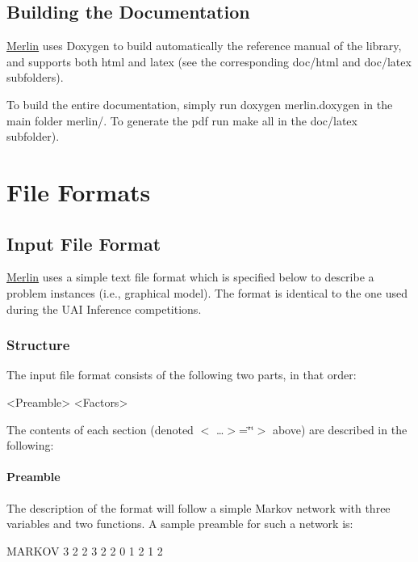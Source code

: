 \subsection*{Building the Documentation}

\hyperlink{classMerlin}{Merlin} uses Doxygen to build automatically the reference manual of the library, and supports both {\ttfamily html} and {\ttfamily latex} (see the corresponding {\ttfamily doc/html} and {\ttfamily doc/latex} subfolders).

To build the entire documentation, simply run {\ttfamily doxygen merlin.\+doxygen} in the main folder {\ttfamily merlin/}. To generate the pdf run {\ttfamily make all} in the {\ttfamily doc/latex} subfolder).

\section*{File Formats}

\subsection*{Input File Format}

\hyperlink{classMerlin}{Merlin} uses a simple text file format which is specified below to describe a problem instances (i.\+e., graphical model). The format is identical to the one used during the U\+AI Inference competitions.

\subsubsection*{Structure}

The input file format consists of the following two parts, in that order\+: \begin{DoxyVerb}    <Preamble>
    <Factors>
\end{DoxyVerb}


The contents of each section (denoted $<$ …$>$=\char`\"{}\char`\"{}$>$ above) are described in the following\+:

\paragraph*{Preamble}

The description of the format will follow a simple Markov network with three variables and two functions. A sample preamble for such a network is\+: \begin{DoxyVerb}    MARKOV
    3
    2 2 3
    2
    2 0 1
    2 1 2
\end{DoxyVerb}


